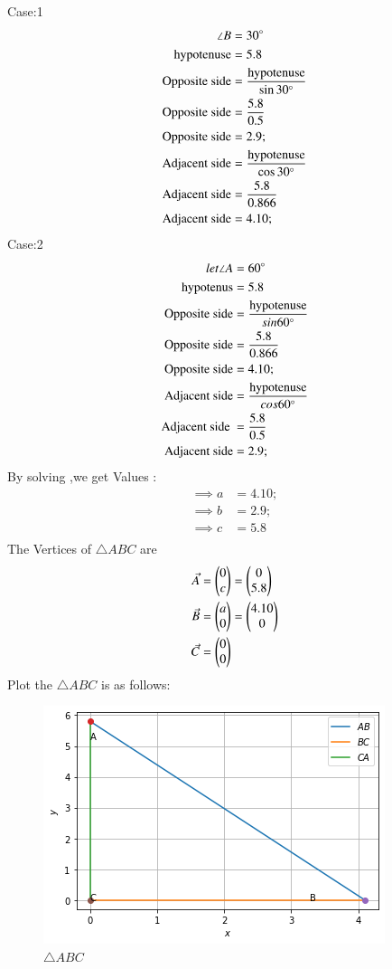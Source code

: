 \documentclass[journal,12pt,twocolumn]{IEEEtran}
\begin{document}
Case:1
\begin{align}
\angle B&=30\degree
\\
\text{hypotenuse}&=5.8
\\
\text{Opposite side}&=\frac {\text{hypotenuse}}{\sin30\degree}
\\
\text{Opposite side} &=\frac {5.8}{0.5}
\\
\text{Opposite side}&=2.9;
 \\
\text{Adjacent side}&=\frac {\text{hypotenuse}}{\cos30\degree}
 \\
\text{Adjacent side} &=\frac {5.8}{0.866}\\
\text{Adjacent side}&=4.10;
\end{align} 
Case:2
\begin {align}
let\angle A& =60\degree
\\
\text{hypotenus}&=5.8
\\
\text{Opposite side}&=\frac{\text{hypotenuse}}{sin60\degree}
\\
\text{Opposite side}&=\frac{5.8}{0.866}
\\
\text{Opposite side}&=4.10;
\\
\text {Adjacent side}&=\frac{\text{hypotenuse}}{cos60\degree}
\\
\text{Adjacent side }&=\frac{5.8}{0.5}
\\
\text{Adjacent side}&=2.9;
\\
\end{align}
By solving ,we get Values :
\begin{align}
\implies a&=4.10;
\\
\implies b&=2.9;
\\
\implies c&=5.8
\\
\end{align}
The  Vertices of $\triangle ABC$ are
\begin{align}
 \Vec {A}&=\begin{pmatrix}0\\ c\end{pmatrix}=\begin{pmatrix}0\\5.8\end{pmatrix} \\ \Vec{B}&=\begin{pmatrix}a\\ 0\end{pmatrix} =\begin{pmatrix}4.10\\ 0\end{pmatrix}\\ \Vec{C}&=\begin{pmatrix}0\\ 0\end{pmatrix}
\end{align}
Plot the $\triangle ABC$ is as follows:
\begin{figure}[h!]
\centering
\includegraphics[width=\columnwidth]{Figure 1.png}
\caption{$\triangle ABC$}
\label{triangle ABC}
\end{figure}
\end{document}
